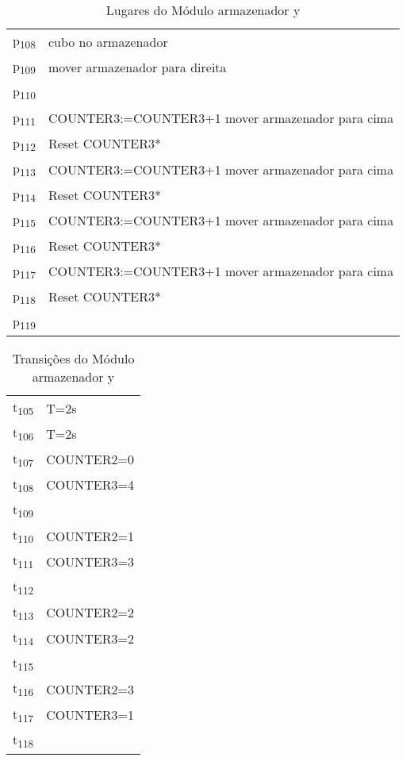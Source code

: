 \begin{table}[htbp]
\caption{Lugares do Módulo armazenador y}
\centering
\begin{tabular}{ll}
p\textsubscript{108} & cubo no armazenador\\
p\textsubscript{109} & mover armazenador para direita\\
p\textsubscript{110} & \\
p\textsubscript{111} & COUNTER3:=COUNTER3+1 mover armazenador para cima\\
p\textsubscript{112} & Reset COUNTER3*\\
p\textsubscript{113} & COUNTER3:=COUNTER3+1 mover armazenador para cima\\
p\textsubscript{114} & Reset COUNTER3*\\
p\textsubscript{115} & COUNTER3:=COUNTER3+1 mover armazenador para cima\\
p\textsubscript{116} & Reset COUNTER3*\\
p\textsubscript{117} & COUNTER3:=COUNTER3+1 mover armazenador para cima\\
p\textsubscript{118} & Reset COUNTER3*\\
p\textsubscript{119} & \\
\end{tabular}
\end{table}

\begin{table}[htbp]
\caption{Transições do Módulo armazenador y}
\centering
\begin{tabular}{ll}
t\textsubscript{105} & T=2s\\
t\textsubscript{106} & T=2s\\
t\textsubscript{107} & COUNTER2=0\\
t\textsubscript{108} & COUNTER3=4\\
t\textsubscript{109} & \\
t\textsubscript{110} & COUNTER2=1\\
t\textsubscript{111} & COUNTER3=3\\
t\textsubscript{112} & \\
t\textsubscript{113} & COUNTER2=2\\
t\textsubscript{114} & COUNTER3=2\\
t\textsubscript{115} & \\
t\textsubscript{116} & COUNTER2=3\\
t\textsubscript{117} & COUNTER3=1\\
t\textsubscript{118} & \\
\end{tabular}
\end{table}
